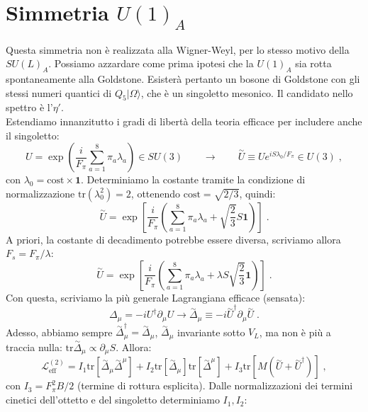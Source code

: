 \documentclass[12pt,a4paper]{article}
\theoremstyle{definition}
\newcommand{\lag}{\mathcal{L}}
\newcommand{\ket}{\rangle}
\newcommand{\adj}[1]{#1^{\dagger}}
\newcommand{\tr}{\mathrm{tr}}
\numberwithin{equation}{section}
\begin{document}
\section{Simmetria $U(1)_A$}
Questa simmetria non è realizzata alla Wigner-Weyl, per lo stesso motivo della $SU(L)_A$. Possiamo azzardare come prima ipotesi che la $U(1)_A$ sia rotta spontaneamente alla Goldstone. Esisterà pertanto un bosone di Goldstone con gli stessi numeri quantici di $Q_5 |\Omega\ket$, che è un singoletto mesonico. Il candidato nello spettro è l'$\eta'$. \\
Estendiamo innanzitutto i gradi di libertà della teoria efficace per includere anche il singoletto:
\begin{equation}
U=\exp\left(\frac{i}{F_{\pi}}\sum_{a=1}^8\pi_a\lambda_a\right)\in SU(3) \qquad \longrightarrow\qquad  \stackrel{\sim}{U}\equiv Ue^{iS\lambda_0/F_{\pi}}\in U(3)\;,
\end{equation}
con $\lambda_0=\mathrm{cost}\times \mathbf{1}$. Determiniamo la costante tramite la condizione di normalizzazione $\tr(\lambda_0^2)=2$, ottenendo $\mathrm{cost}=\sqrt{2/3}$, quindi:
\begin{equation*}
\stackrel{\sim}{U}=\exp\left[\frac{i}{F_{\pi}}\left(\sum_{a=1}^8\pi_a\lambda_a+\sqrt{\frac{2}{3}}S\mathbf{1}\right)\right]\;.
\end{equation*}
A priori, la costante di decadimento potrebbe essere diversa, scriviamo allora $F_s=F_{\pi}/\lambda$:
\begin{equation}
\boxed{
\stackrel{\sim}{U}=\exp\left[\frac{i}{F_{\pi}}\left(\sum_{a=1}^8\pi_a\lambda_a+\lambda S\sqrt{\frac{2}{3}}\mathbf{1}\right)\right]
}\;.
\end{equation}
Con questa, scriviamo la più generale Lagrangiana efficace (sensata):
$$
\Delta_{\mu}=-i\adj{U}\partial_{\mu}U \longrightarrow \stackrel{\sim}{\Delta}_{\mu}\equiv -i\adj{\stackrel{\sim}{U}}\partial_{\mu}\stackrel{\sim}{U}\;.
$$
Adesso, abbiamo sempre $\adj{\stackrel{\sim}{\Delta}_{\mu}}=\stackrel{\sim}{\Delta}_{\mu}$, $\stackrel{\sim}{\Delta}_{\mu}$ invariante sotto $V_L$, ma non è più a traccia nulla:  $\tr\stackrel{\sim}{\Delta}_{\mu}\propto\partial_{\mu}S$. Allora:
$$
\lag_{\mathrm{eff}}^{(2)}=I_1\tr\left[\stackrel{\sim}{\Delta}_{\mu}\stackrel{\sim}{\Delta}^{\mu}\right]+I_2\tr[\stackrel{\sim}{\Delta}_{\mu}]\tr[\stackrel{\sim}{\Delta}^{\mu}]+I_3\tr[M(\stackrel{\sim}{U}+\adj{\stackrel{\sim}{U}})]\;,
$$
con $I_3=F_{\pi}^2B/2$ (termine di rottura esplicita). Dalle normalizzazioni dei termini cinetici dell'ottetto e del singoletto determiniamo $I_1,I_2$:
\end{document}
